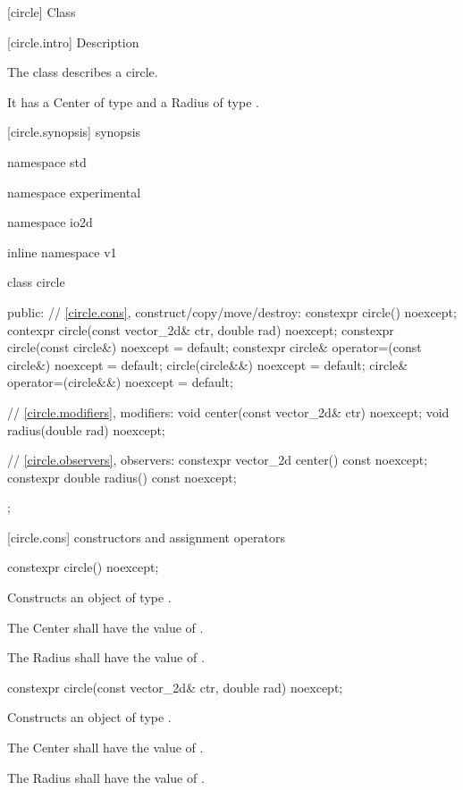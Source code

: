  [circle] {Class }

 [circle.intro] { Description}

\pnum
{}
The class  describes a circle.

\pnum
It has a Center of type  and a Radius of type .

 [circle.synopsis] { synopsis}

\begin{codeblock}
namespace std { namespace experimental { namespace io2d { inline namespace v1 {
  class circle {
  public:
    // \ref{circle.cons}, construct/copy/move/destroy:
    constexpr circle() noexcept;
    contexpr circle(const vector_2d& ctr, double rad) noexcept;
    constexpr circle(const circle&) noexcept = default;
    constexpr circle& operator=(const circle&) noexcept = default;
    circle(circle&&) noexcept = default;
    circle& operator=(circle&&) noexcept = default;

    // \ref{circle.modifiers}, modifiers:
    void center(const vector_2d& ctr) noexcept;
    void radius(double rad) noexcept;
    
    // \ref{circle.observers}, observers:
    constexpr vector_2d center() const noexcept;
    constexpr double radius() const noexcept;
  };
} } } }
\end{codeblock}

 [circle.cons] { constructors and assignment operators}

\begin{itemdecl}
constexpr circle() noexcept;
\end{itemdecl}
\begin{itemdescr}
\pnum
\effects
Constructs an object of type .

\pnum
The Center shall have the value of .

\pnum
The Radius shall have the value of .
\end{itemdescr}

\begin{itemdecl}
constexpr circle(const vector_2d& ctr, double rad) noexcept;
\end{itemdecl}
\begin{itemdescr}
\pnum
\effects
Constructs an object of type .

\pnum
The Center shall have the value of .

\pnum
The Radius shall have the value of .
\end{itemdescr}

